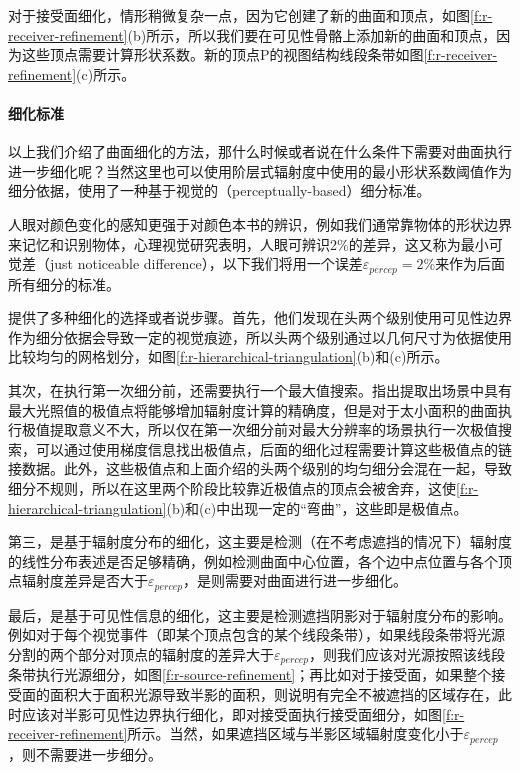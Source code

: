 对于接受面细化，情形稍微复杂一点，因为它创建了新的曲面和顶点，如图\ref{f:r-receiver-refinement}(b)所示，所以我们要在可见性骨骼上添加新的曲面和顶点，因为这些顶点需要计算形状系数。新的顶点P的视图结构线段条带如图\ref{f:r-receiver-refinement}(c)所示。




\paragraph{细化标准}
以上我们介绍了曲面细化的方法，那什么时候或者说在什么条件下需要对曲面执行进一步细化呢？当然这里也可以使用阶层式辐射度中使用的最小形状系数阈值作为细分依据，\cite{a:FastandAccurateHierarchicalRadiosityUsingGlobalVisibility}使用了一种基于视觉的（perceptually-based）细分标准。

人眼对颜色变化的感知更强于对颜色本书的辨识，例如我们通常靠物体的形状边界来记忆和识别物体，心理视觉研究\cite{a:Perceptually-drivenradiosity,a:Colordisplaysandcolorscience}表明，人眼可辨识2\%的差异，这又称为最小可觉差（just noticeable difference），以下我们将用一个误差$\varepsilon_{percep}=2\%$来作为后面所有细分的标准。

\cite{a:FastandAccurateHierarchicalRadiosityUsingGlobalVisibility}提供了多种细化的选择或者说步骤。首先，他们发现在头两个级别使用可见性边界作为细分依据会导致一定的视觉痕迹，所以头两个级别通过以几何尺寸为依据使用比较均匀的网格划分，如图\ref{f:r-hierarchical-triangulation}(b)和(c)所示。

其次，在执行第一次细分前，还需要执行一个最大值搜索。\cite{a:Accurateandconsistentreconstructionofilluminationfunctionsusingstructuredsampling}指出提取出场景中具有最大光照值的极值点将能够增加辐射度计算的精确度，但是对于太小面积的曲面执行极值提取意义不大，所以仅在第一次细分前对最大分辨率的场景执行一次极值搜索，可以通过使用梯度信息找出极值点，后面的细化过程需要计算这些极值点的链接数据。此外，这些极值点和上面介绍的头两个级别的均匀细分会混在一起，导致细分不规则，所以在这里两个阶段比较靠近极值点的顶点会被舍弃，这使\ref{f:r-hierarchical-triangulation}(b)和(c)中出现一定的“弯曲”，这些即是极值点。

第三，是基于辐射度分布的细化，这主要是检测（在不考虑遮挡的情况下）辐射度的线性分布表述是否足够精确，例如检测曲面中心位置，各个边中点位置与各个顶点辐射度差异是否大于$\varepsilon_{percep}$，是则需要对曲面进行进一步细化。

最后，是基于可见性信息的细化，这主要是检测遮挡阴影对于辐射度分布的影响。例如对于每个视觉事件（即某个顶点包含的某个线段条带），如果线段条带将光源分割的两个部分对顶点的辐射度的差异大于$\varepsilon_{percep}$，则我们应该对光源按照该线段条带执行光源细分，如图\ref{f:r-source-refinement}；再比如对于接受面，如果整个接受面的面积大于面积光源导致半影的面积，则说明有完全不被遮挡的区域存在，此时应该对半影可见性边界执行细化，即对接受面执行接受面细分，如图\ref{f:r-receiver-refinement}所示。当然，如果遮挡区域与半影区域辐射度变化小于$\varepsilon_{percep}$，则不需要进一步细分。




